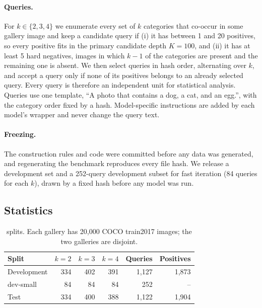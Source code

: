 \paragraph{Queries.}
For $k\in\{2,3,4\}$ we enumerate every set of $k$ categories that co-occur in some gallery image and keep a candidate query if
(i) it has between 1 and 20 positives, so every positive fits in the primary candidate depth $K{=}100$, and
(ii) it has at least 5 hard negatives, images in which $k{-}1$ of the categories are present and the remaining one is absent.
We then select queries in hash order, alternating over $k$, and accept a query only if none of its positives belongs to an already selected query.
Every query is therefore an independent unit for statistical analysis.
Queries use one template, ``A photo that contains a dog, a cat, and an egg.'', with the category order fixed by a hash.
Model-specific instructions are added by each model's wrapper and never change the query text.

\paragraph{Freezing.}
The construction rules and code were committed before any data was generated, and regenerating the benchmark reproduces every file hash.
We release a development set and a 252-query development subset for fast iteration (84 queries for each $k$), drawn by a fixed hash before any model was run.

\subsection{Statistics}

\begin{table}[t]
\caption{\bench{} splits. Each gallery has 20{,}000 COCO train2017 images; the two galleries are disjoint.}
\label{tab:bench-stats}
\centering
\small
\setlength{\tabcolsep}{4pt}
\begin{tabular}{lrrrrr}
\toprule
Split & $k{=}2$ & $k{=}3$ & $k{=}4$ & Queries & Positives \\
\midrule
Development & 334 & 402 & 391 & 1{,}127 & 1{,}873 \\
\quad dev-small & 84 & 84 & 84 & 252 & -- \\
Test & 334 & 400 & 388 & 1{,}122 & 1{,}904 \\
\bottomrule
\end{tabular}
\end{table}

